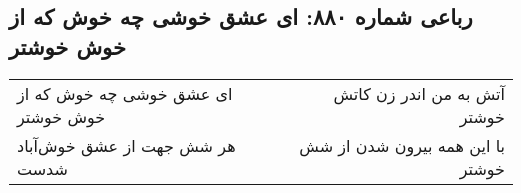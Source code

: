 \begin{center}
\section*{رباعی شماره ۸۸۰: ای عشق خوشی چه خوش که از خوش خوشتر}
\label{sec:0880}
\begin{longtable}{l p{0.5cm} r}
ای عشق خوشی چه خوش که از خوش خوشتر
&&
آتش به من اندر زن کاتش خوشتر
\\
هر شش جهت از عشق خوش‌آباد شدست
&&
با این همه بیرون شدن از شش خوشتر
\\
\end{longtable}
\end{center}
